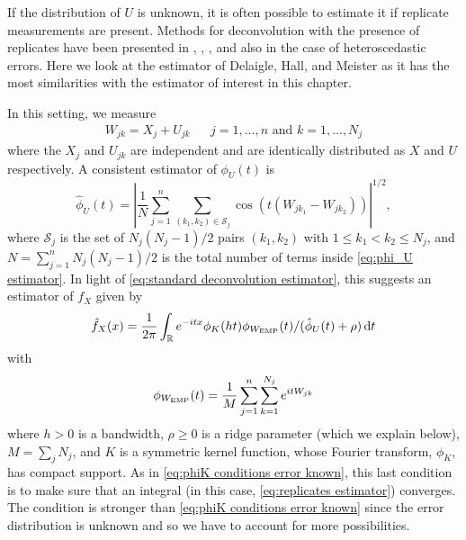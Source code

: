 	If the distribution of $U$ is unknown, it is often possible to estimate it if replicate measurements are present. Methods for deconvolution with the presence of replicates have been presented in \cite{Li1998-mj}, \cite{Lin2006-mm}, \cite{Delaigle2008-hl}, and also \cite{McIntyre2011-fg} in the case of heteroscedastic errors. Here we look at the estimator of Delaigle, Hall, and Meister \cite{Delaigle2008-hl} as it has the most similarities with the estimator of interest in this chapter.

	In this setting, we measure
	\begin{align}
		W_{jk} = X_j + U_{jk} && j = 1, \dots, n \text{ and } k = 1, \dots, N_j
	\end{align}
	where the $X_j$ and $U_{jk}$ are independent and are identically distributed as $X$ and $U$ respectively. A consistent estimator of $\phi_U(t)$ is
	\begin{equation}
		\hat{\phi}_U(t) = \left|\frac{1}{N} \sum_{j = 1}^n \sum_{(k_1, k_2) \in \mathscr{S}_j} \cos \left(t (W_{jk_1} - W_{jk_2})\right)\right|^{1/2},
		\label{eq:phi_U estimator}
	\end{equation}
	where $\mathscr{S}_j$ is the set of $N_j(N_j - 1)/2$ pairs $(k_1, k_2)$ with $1 \leq k_1 < k_2 \leq N_j$, and $N = \sum_{j=1}^n N_j(N_j - 1)/2$ is the total number of terms inside \eqref{eq:phi_U estimator}.
	In light of \eqref{eq:standard deconvolution estimator}, this suggests an estimator of $f_X$ given by 
	\begin{equation}
	\label{eq:replicates estimator}
		\hat{f}_X(x) = \frac{1}{2\pi} \int_\mathbb{R} e^{-itx} \phi_K(ht) \phi_{W_\mathrm{EMP}}(t)  / (\hat{\phi}_U(t) + \rho )\, \mathrm{d} t
	\end{equation}
	with
	\begin{equation}
		\phi_{W_\mathrm{EMP}}(t) = \frac{1}{M} \sum_{j = 1}^n \sum_{k= 1}^{N_j} e^{i t W_{jk}}
	\end{equation}
	where
	$h > 0$ is a bandwidth, $\rho \geq 0$ is a ridge parameter (which we explain below), $M = \sum_j N_j$, and $K$ is a symmetric kernel function, whose Fourier transform, $\phi_K$, has compact support. As in \eqref{eq:phiK conditions error known}, this last condition is to make sure that an integral (in this case, \eqref{eq:replicates estimator}) converges. The condition is stronger than \eqref{eq:phiK conditions error known} since the error distribution is unknown and so we have to account for more possibilities.

